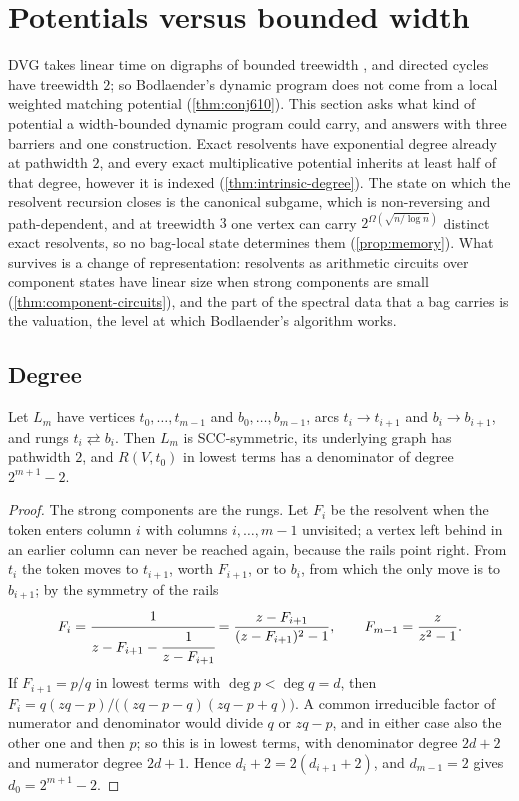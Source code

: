 \section{Potentials versus bounded width}\label{sec:treewidth}

DVG takes linear time on digraphs of bounded treewidth \cite{Bodlaender}, and directed cycles have treewidth $2$; so Bodlaender's dynamic program does not come from a local weighted matching potential (\cref{thm:conj610}). This section asks what kind of potential a width-bounded dynamic program could carry, and answers with three barriers and one construction. Exact resolvents have exponential degree already at pathwidth $2$, and every exact multiplicative potential inherits at least half of that degree, however it is indexed (\cref{thm:intrinsic-degree}). The state on which the resolvent recursion closes is the canonical subgame, which is non-reversing and path-dependent, and at treewidth $3$ one vertex can carry $2^{\Omega(\sqrt{n/\log n})}$ distinct exact resolvents, so no bag-local state determines them (\cref{prop:memory}). What survives is a change of representation: resolvents as arithmetic circuits over component states have linear size when strong components are small (\cref{thm:component-circuits}), and the part of the spectral data that a bag carries is the valuation, the level at which Bodlaender's algorithm works.

\subsection{Degree}

\begin{theorem}\label{thm:ladders}
Let $L_m$ have vertices $t_0,\dots,t_{m-1}$ and $b_0,\dots,b_{m-1}$, arcs $t_i\to t_{i+1}$ and $b_i\to b_{i+1}$, and rungs $t_i\rightleftarrows b_i$. Then $L_m$ is SCC-symmetric, its underlying graph has pathwidth $2$, and $R(V,t_0)$ in lowest terms has a denominator of degree $2^{m+1}-2$.
\end{theorem}
\begin{proof}
The strong components are the rungs. Let $F_i$ be the resolvent when the token enters column $i$ with columns $i,\dots,m-1$ unvisited; a vertex left behind in an earlier column can never be reached again, because the rails point right. From $t_i$ the token moves to $t_{i+1}$, worth $F_{i+1}$, or to $b_i$, from which the only move is to $b_{i+1}$; by the symmetry of the rails
\[
F_i=\cfrac{1}{z-F_{i+1}-\cfrac{1}{z-F_{i+1}}}=\frac{z-F_{i+1}}{(z-F_{i+1})^{2}-1},\qquad F_{m-1}=\frac{z}{z^{2}-1}.
\]
If $F_{i+1}=p/q$ in lowest terms with $\deg p<\deg q=d$, then $F_i=q(zq-p)/\bigl((zq-p-q)(zq-p+q)\bigr)$. A common irreducible factor of numerator and denominator would divide $q$ or $zq-p$, and in either case also the other one and then $p$; so this is in lowest terms, with denominator degree $2d+2$ and numerator degree $2d+1$. Hence $d_i+2=2(d_{i+1}+2)$, and $d_{m-1}=2$ gives $d_0=2^{m+1}-2$.
\end{proof}

